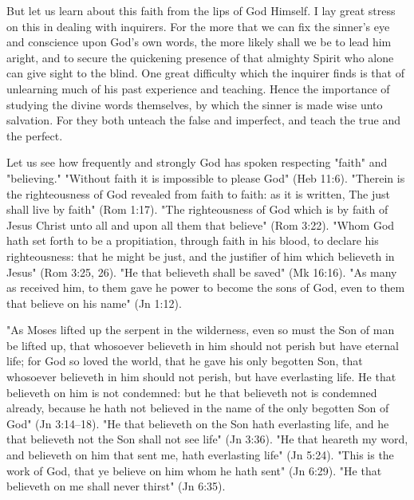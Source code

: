 \documentclass[
]{book}
\begin{document}
But let us learn about this faith from the lips of God Himself. I lay great stress on this in dealing with inquirers. For the more that we can fix the sinner's eye and conscience upon God's own words, the more likely shall we be to lead him aright, and to secure the quickening presence of that almighty Spirit who alone can give sight to the blind. One great difficulty which the inquirer finds is that of unlearning much of his past experience and teaching. Hence the importance of studying the divine words themselves, by which the sinner is made wise unto salvation. For they both unteach the false and imperfect, and teach the true and the perfect.

Let us see how frequently and strongly God has spoken respecting "faith" and "believing." "Without faith it is impossible to please God" (Heb 11:6). "Therein is the righteousness of God revealed from faith to faith: as it is written, The just shall live by faith" (Rom 1:17). "The righteousness of God which is by faith of Jesus Christ unto all and upon all them that believe" (Rom 3:22). "Whom God hath set forth to be a propitiation, through faith in his blood, to declare his righteousness: that he might be just, and the justifier of him which believeth in Jesus" (Rom 3:25, 26). "He that believeth shall be saved" (Mk 16:16). "As many as received him, to them gave he power to become the sons of God, even to them that believe on his name" (Jn 1:12).

"As Moses lifted up the serpent in the wilderness, even so must the Son of man be lifted up, that whosoever believeth in him should not perish but have eternal life; for God so loved the world, that he gave his only begotten Son, that whosoever believeth in him should not perish, but have everlasting life. He that believeth on him is not condemned: but he that believeth not is condemned already, because he hath not believed in the name of the only begotten Son of God" (Jn 3:14--18). "He that believeth on the Son hath everlasting life, and he that believeth not the Son shall not see life" (Jn 3:36). "He that heareth my word, and believeth on him that sent me, hath everlasting life" (Jn 5:24). "This is the work of God, that ye believe on him whom he hath sent" (Jn 6:29). "He that believeth on me shall never thirst" (Jn 6:35).
\end{document}
